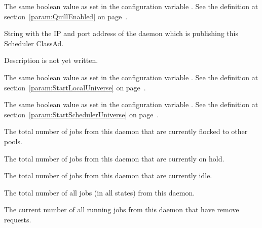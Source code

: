 \begin{description}
\item[\AdAttr{QuillEnabled}:] The same boolean value as set in the
  configuration variable .
  See the definition at section~\ref{param:QuillEnabled} on
  page~\pageref{param:QuillEnabled}.

\item[\AdAttr{ScheddIpAddr}:] String with the IP and port address of the
 daemon which is publishing this Scheduler ClassAd.

\item[\AdAttr{ServerTime}:] Description is not yet written.

\item[\AdAttr{StartLocalUniverse}:] The same boolean value as set in the
  configuration variable .
  See the definition at section~\ref{param:StartLocalUniverse} on
  page~\pageref{param:StartLocalUniverse}.

\item[\AdAttr{StartSchedulerUniverse}:] The same boolean value as set in the
  configuration variable .
  See the definition at section~\ref{param:StartSchedulerUniverse} on
  page~\pageref{param:StartSchedulerUniverse}.

\item[\AdAttr{TotalFlockedJobs}:] The total number of jobs from this
   daemon that are currently flocked to other pools.

\item[\AdAttr{TotalHeldJobs}:] The total number of jobs from this
   daemon that are currently on hold.

\item[\AdAttr{TotalIdleJobs}:] The total number of jobs from this
   daemon that are currently idle.

\item[\AdAttr{TotalJobAds}:] The total number of all jobs (in all 
  states) from this  daemon.

\item[\AdAttr{TotalRemovedJobs}:] The current number of all running jobs
  from this  daemon that have remove requests.


\end{description}
